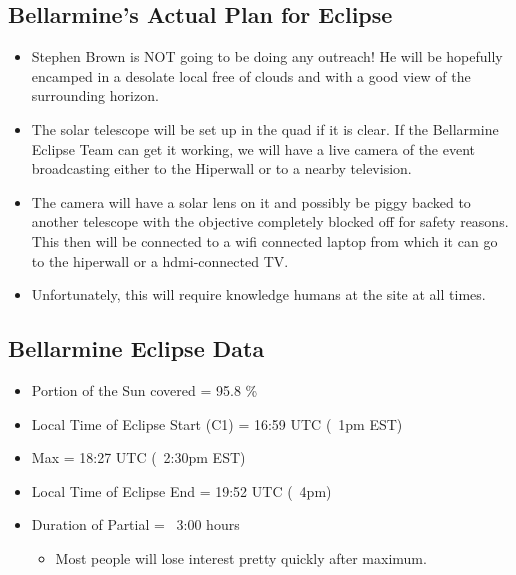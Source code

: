 \documentclass{article}
\begin{document}

\subsection{Bellarmine's Actual Plan for Eclipse}
\begin{itemize}
\item Stephen Brown is NOT going to be doing any outreach!  He will be hopefully encamped in a desolate local free of clouds and with a good view of the surrounding horizon.
\item The solar telescope will be set up in the quad if it is clear.  If the Bellarmine Eclipse Team can get it working, we will have a live camera of the event broadcasting either to the Hiperwall or to a nearby television.
\item The camera will have a solar lens on it and possibly be piggy backed to another telescope with the objective completely blocked off for safety reasons.  This then will be connected to a wifi connected laptop from which it can go to the hiperwall or a hdmi-connected TV. 
\item Unfortunately, this will require knowledge humans at the site at all times.
\end{itemize}

\subsection{Bellarmine Eclipse Data}
\begin{itemize}
\item Portion of the Sun covered = 95.8 \%
\item Local Time of Eclipse Start (C1) = 16:59 UTC (~1pm EST)
\item Max = 18:27 UTC (~2:30pm EST)
\item Local Time of Eclipse End = 19:52 UTC (~4pm)
\item Duration of Partial = ~3:00 hours
	\begin{itemize}
	\item Most people will lose interest pretty quickly after maximum.
	\end{itemize}
\end{itemize}
\end{document}
